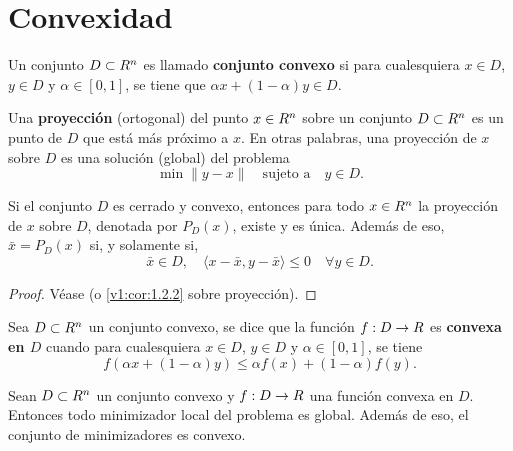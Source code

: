 
\section{Convexidad}
\label{v2:sec:1.3}

\begin{definition}\label{v2:def:1.3.1}
    Un conjunto $D \subset R^n$ es llamado \textbf{conjunto convexo} si para cualesquiera $x \in D$, $y \in D$ y $\alpha \in [0, 1]$, se tiene que $\alpha x + (1 - \alpha)y \in D$.
\end{definition}

Una \textbf{proyección} (ortogonal) del punto $x \in R^n$ sobre un conjunto $D \subset R^n$ es un punto de $D$ que está más próximo a $x$. En otras palabras, una proyección de $x$ sobre $D$ es una solución (global) del problema
\begin{equation}
    \min \|y - x\| \quad \text{sujeto a} \quad y \in D.
    \label{v2:eq:1.26}
\end{equation}

\begin{theorem}\label{v2:thm:1.3.1}
    Si el conjunto $D$ es cerrado y convexo, entonces para todo $x \in R^n$ la proyección de $x$ sobre $D$, denotada por $P_D(x)$, existe y es única. Además de eso, $\bar{x} = P_D(x)$ si, y solamente si,
    \begin{equation}
        \bar{x} \in D, \quad \langle x - \bar{x}, y - \bar{x} \rangle \le 0 \quad \forall y \in D.
        \label{v2:eq:1.27}
    \end{equation}
\end{theorem}

\begin{proof}
    Véase \cite{izmailov2020otimizacaovolume1} (o \cref{v1:cor:1.2.2} sobre proyección).
\end{proof}

\begin{definition}\label{v2:def:1.3.2}
    Sea $D \subset R^n$ un conjunto convexo, se dice que la función $f : D \to R$ es \textbf{convexa en $D$} cuando para cualesquiera $x \in D$, $y \in D$ y $\alpha \in [0, 1]$, se tiene
    \[
        f(\alpha x + (1 - \alpha)y) \le \alpha f(x) + (1 - \alpha)f(y).
    \]
\end{definition}

\begin{theorem}\label{v2:thm:1.3.2}
    Sean $D \subset R^n$ un conjunto convexo y $f : D \to R$ una función convexa en $D$.
    Entonces todo minimizador local del problema es global. Además de eso, el conjunto de minimizadores es convexo.
\end{theorem}

